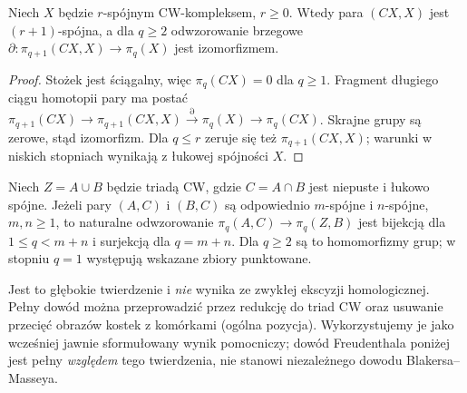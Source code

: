 \begin{lemat}
\label{lem:cone-relative-v8}
Niech $X$ będzie $r$-spójnym CW-kompleksem,
$r\ge0$. Wtedy para $(CX,X)$ jest $(r+1)$-spójna,
a dla $q\ge2$ odwzorowanie brzegowe
$\partial:\pi_{q+1}(CX,X)\to\pi_q(X)$
jest izomorfizmem.
\end{lemat}
\begin{proof}
Stożek jest ściągalny, więc $\pi_q(CX)=0$ dla
$q\ge1$. Fragment długiego ciągu homotopii pary ma postać
$\pi_{q+1}(CX)\to\pi_{q+1}(CX,X)
\xrightarrow{\partial}\pi_q(X)\to\pi_q(CX)$.
Skrajne grupy są zerowe, stąd izomorfizm.
Dla $q\le r$ zeruje się też $\pi_{q+1}(CX,X)$;
warunki w niskich stopniach wynikają z łukowej spójności $X$.
\end{proof}

\begin{twierdzenie}
\label{thm:bm-v8}
Niech $Z=A\cup B$ będzie triadą CW, gdzie
$C=A\cap B$ jest niepuste i łukowo spójne.
Jeżeli pary $(A,C)$ i $(B,C)$ są odpowiednio
$m$-spójne i $n$-spójne, $m,n\ge1$, to naturalne odwzorowanie
$\pi_q(A,C)\to\pi_q(Z,B)$ jest bijekcją dla
$1\le q<m+n$ i surjekcją dla $q=m+n$.
Dla $q\ge2$ są to homomorfizmy grup; w stopniu $q=1$
występują wskazane zbiory punktowane.
\end{twierdzenie}
\begin{uwaga}
Jest to głębokie twierdzenie i \emph{nie} wynika ze
zwykłej ekscyzji homologicznej. Pełny dowód można
przeprowadzić przez redukcję do triad CW oraz
usuwanie przecięć obrazów kostek z komórkami
(ogólna pozycja). Wykorzystujemy je jako
wcześniej jawnie sformułowany wynik pomocniczy;
dowód Freudenthala poniżej jest pełny \emph{względem}
tego twierdzenia, nie stanowi niezależnego dowodu
Blakersa--Masseya.
\end{uwaga}

